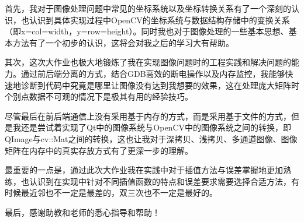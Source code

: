 \documentclass[UTF8]{ctexart}
\begin{document}
首先，我对于图像处理问题中常见的坐标系统以及坐标转换关系有了一个深刻的认识，也认识到具体实现过程中OpenCV的坐标系统与数据结构存储中的变换关系（即x=col=width，y=row=height）。同时我也对于图像处理的一些基本思想、基本方法有了一个初步的认识，这将会对我之后的学习大有帮助。

其次，这次大作业也极大地锻炼了我在实现图像问题时的工程实践和解决问题的能力。通过前后端分离的方式，结合GDB高效的断电操作以及内存监控，我能够快速地诊断到代码中究竟是哪里让图像没有达到我想要的效果，这在处理庞大矩阵时个别点数据不可观的情况下是极其有用的经验技巧。

尽管最后在前后端通信上没有采用基于内存的方式，而是采用基于文件的方式，但是我还是尝试着实现了Qt中的图像系统与OpenCV中的图像系统之间的转换，即QImage与cv::Mat之间的转换，这也让我对于深拷贝、浅拷贝、多通道图像、图像矩阵在内存中的真实存放方式有了更深一步的理解。

最重要的一点是，通过此次大作业我在实践中对于插值方法与误差掌握地更加熟练，也认识到在实现中针对不同插值函数的特点和误差要求需要选择合适方法，有时候最近邻也不一定是最差的，双三次也不一定是最好的。

最后，感谢助教和老师的悉心指导和帮助！
\end{document}
